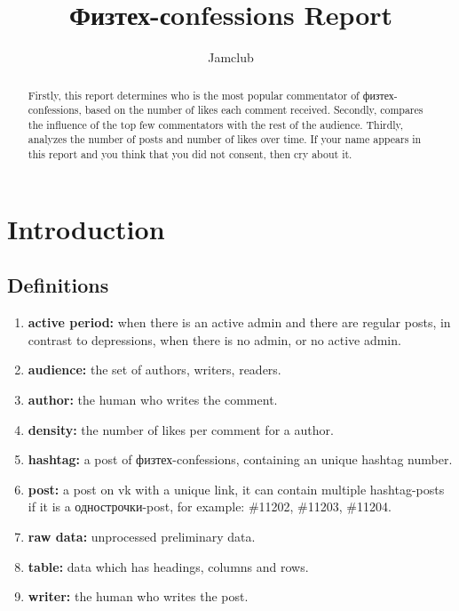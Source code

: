 \documentclass[
	12pt
] {article}
\author[1]{Jamclub}
\affil[1]{Физтех-confessions}
\title{Физтех-сonfessions Report}
\begin{document}
\maketitle
\renewcommand{\arraystretch}{1.4}

\begin{abstract}
	Firstly, this report determines who is the most popular commentator of физтех-confessions, based on the number of likes each comment received.
	Secondly, compares the influence of the top few commentators with the rest of the audience.
	Thirdly, analyzes the number of posts and number of likes over time.
	If your name appears in this report and you think that you did not consent, then cry about it.
	\end{abstract}

\tableofcontents

\newpage
\section{Introduction}
\subsection{Definitions}
	\begin{enumerate}
		\item \textbf{active period:} when there is an active admin and there are regular posts, in contrast to depressions, when there is no admin, or no active admin.
		\item \textbf{audience:} the set of authors, writers, readers.
		\item \textbf{author:} the human who writes the comment.
		\item \textbf{density:} the number of likes per comment for a author.
		\item \textbf{hashtag:} a post of физтех-confessions, containing an unique hashtag number.
		\item \textbf{post:} a post on vk with a unique link, it can contain multiple hashtag-posts if it is a однострочки-post, for example: \#11202, \#11203, \#11204.
		\item \textbf{raw data:} unprocessed preliminary data.
		\item \textbf{table:} data which has headings, columns and rows.
		\item \textbf{writer:} the human who writes the post.
	\end{enumerate}
	
	
\end{document}
